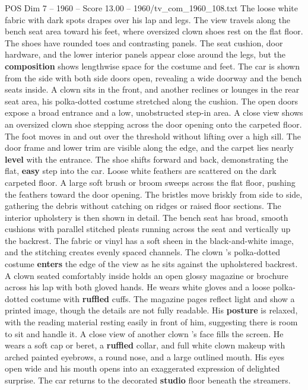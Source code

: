 \begin{textsample}{POS Dim 7 – 1960 – Score 13.00 – 1960/tv\_com\_1960\_108.txt}
The loose white fabric with dark spots drapes over his lap and legs.
The view travels along the bench seat area toward his feet, where oversized clown shoes rest on the flat floor.
The shoes have rounded toes and contrasting panels.
The seat cushion, door hardware, and the lower interior panels appear close around the legs, but the \textbf{composition} shows lengthwise space for the costume and feet.
The car is shown from the side with both side doors open, revealing a wide doorway and the bench seats inside.
A clown sits in the front, and another reclines or lounges in the rear seat area, his polka-dotted costume stretched along the cushion.
The open doors expose a broad entrance and a low, unobstructed step-in area.
A close view shows an oversized clown shoe stepping across the door opening onto the carpeted floor.
The foot moves in and out over the threshold without lifting over a high sill.
The door frame and lower trim are visible along the edge, and the carpet lies nearly \textbf{level} with the entrance.
The shoe shifts forward and back, demonstrating the flat, \textbf{easy} step into the car.
Loose white feathers are scattered on the dark carpeted floor.
A large soft brush or broom sweeps across the flat floor, pushing the feathers toward the door opening.
The bristles move briskly from side to side, gathering the debris without catching on ridges or raised floor sections.
The interior upholstery is then shown in detail.
The bench seat has broad, smooth cushions with parallel stitched pleats running across the seat and vertically up the backrest.
The fabric or vinyl has a soft sheen in the black-and-white image, and the stitching creates evenly spaced channels.
The clown ’s polka-dotted costume \textbf{enters} the edge of the view as he sits against the upholstered backrest.
A clown seated comfortably inside holds an open glossy magazine or brochure across his lap with both gloved hands.
He wears white gloves and a loose polka-dotted costume with \textbf{ruffled} cuffs.
The magazine pages reflect light and show a printed image, though the details are not fully readable.
His \textbf{posture} is relaxed, with the reading material resting easily in front of him, suggesting there is room to sit and handle it.
A close view of another clown ’s face fills the screen.
He wears a soft cap or beret, a \textbf{ruffled} collar, and full white clown makeup with arched painted eyebrows, a round nose, and a large outlined mouth.
His eyes open wide and his mouth opens into an exaggerated expression of delighted surprise.
The car returns to the decorated \textbf{studio} floor beneath the streamers.

\end{textsample}
